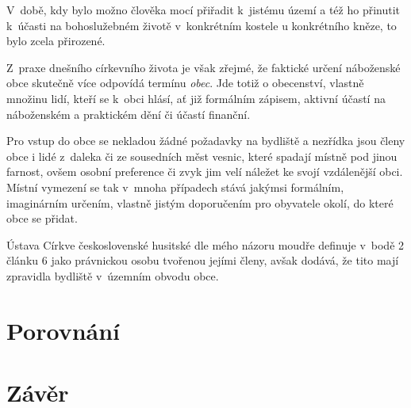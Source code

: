 V~době, kdy bylo možno
člověka mocí přiřadit k~jistému území a též ho přinutit k~účasti na
bohoslužebném životě v~konkrétním kostele u konkrétního kněze, to bylo zcela
přirozené.

Z~praxe dnešního církevního života je však zřejmé, že faktické určení náboženské
obce skutečně více odpovídá termínu \textit{obec}. Jde totiž o obecenství,
vlastně množinu lidí, kteří se k~obci hlásí, ať již formálním zápisem, aktivní
účastí na náboženském a praktickém dění či účastí finanční.

Pro vstup do obce se nekladou žádné požadavky na bydliště a nezřídka jsou členy
obce i lidé z~daleka či ze sousedních měst vesnic, které spadají místně pod
jinou farnost, ovšem osobní preference či zvyk jim velí náležet ke svojí
vzdálenější obci. Místní vymezení se tak v~mnoha případech stává jakýmsi
formálním, imaginárním určením, vlastně jistým doporučením pro obyvatele okolí,
do které obce se přidat.

Ústava Církve československé husitské dle mého názoru moudře definuje v~bodě 2
článku 6 jako právnickou osobu tvořenou jejími členy, avšak dodává, že tito mají
zpravidla bydliště v~územním obvodu obce.

\chapter{Porovnání}



\chapter{Závěr}


